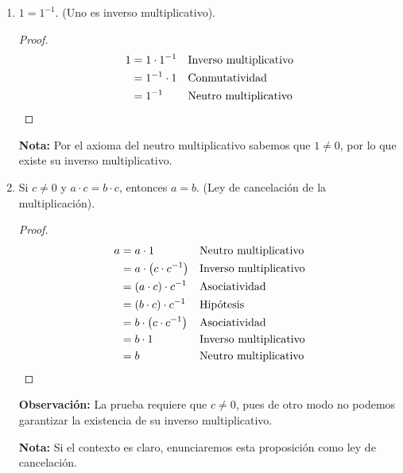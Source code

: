 \documentclass[11pt]{article}
\begin{document}
\begin{enumerate}[label=\alph*)]
    \item $1=1^{-1}$. (Uno es inverso multiplicativo).
    \vspace{-1em}
    \begin{proof} 
    \begin{align*}
        1 &= 1 \cdot 1^{-1} && \text{Inverso multiplicativo}\\
        &= 1^{-1} \cdot 1 && \text{Conmutatividad}\\
        &= 1^{-1} && \text{Neutro multiplicativo} \qedhere
    \end{align*}    
    \end{proof} \vspace{-1em}
    \textbf{Nota:} Por el axioma del neutro multiplicativo sabemos que $1\neq 0$, por lo que existe su inverso multiplicativo.

\pagebreak
    
    \item Si $c\neq 0$ y $a\cdot c=b\cdot c$, entonces $a=b$. (Ley de cancelación de la multiplicación).
    \vspace{-1em}\begin{proof} 
        \begin{align*}
            a &= a\cdot 1 && \text{Neutro multiplicativo}\\
            &= a \cdot \bigl(c\cdot c^{-1}\bigr) && \text{Inverso multiplicativo}\\
            &= (a \cdot c) \cdot c^{-1} && \text{Asociatividad}\\
            &= (b \cdot c) \cdot c^{-1} && \text{Hipótesis}\\
            &= b \cdot \bigl(c\cdot c^{-1}\bigr) && \text{Asociatividad}\\
            &= b \cdot 1 && \text{Inverso multiplicativo}\\
            &= b && \text{Neutro multiplicativo}\qedhere
            \end{align*}    
    \end{proof} \vspace{-1em}
    \textbf{Observación:} La prueba requiere que $c\neq 0$, pues de otro modo no podemos garantizar la existencia de su inverso multiplicativo.

    \textbf{Nota:} Si el contexto es claro, enunciaremos esta proposición como ley de cancelación.
    \end{enumerate}
    
\end{document}
